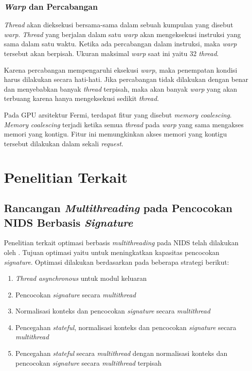 
    \subsubsection{\emph{Warp} dan Percabangan}

      \emph{Thread} akan dieksekusi bersama-sama dalam sebuah kumpulan yang disebut \emph{warp}. \emph{Thread} yang berjalan dalam satu \emph{warp} akan mengeksekusi instruksi yang sama dalam satu waktu. Ketika ada percabangan dalam instruksi, maka \emph{warp} tersebut akan berpisah. Ukuran maksimal \emph{warp} saat ini yaitu 32 \emph{thread}.

      Karena percabangan mempengaruhi eksekusi \emph{warp}, maka penempatan kondisi harus dilakukan secara hati-hati. Jika percabangan tidak dilakukan dengan benar dan menyebabkan banyak \emph{thread} terpisah, maka akan banyak \emph{warp} yang akan terbuang karena hanya mengeksekusi sedikit \emph{thread}.
      
      Pada GPU arsitektur Fermi, terdapat fitur yang disebut \emph{memory coalescing}. \emph{Memory coalescing} terjadi ketika semua \emph{thread} pada \emph{warp} yang sama mengakses memori yang kontigu. Fitur ini memungkinkan akses memori yang kontigu tersebut dilakukan dalam sekali \emph{request}.

\section{Penelitian Terkait}

  \subsection{Rancangan \emph{Multithreading} pada Pencocokan NIDS Berbasis \emph{Signature}} 

    Penelitian terkait optimasi berbasis \emph{multithreading} pada NIDS telah dilakukan oleh \cite{multi2004}. Tujuan optimasi yaitu untuk meningkatkan kapasitas pencocokan \emph{signature}. Optimasi dilakukan berdasarkan pada beberapa strategi berikut:

    \begin{enumerate}
      \item \emph{Thread asynchronous} untuk modul keluaran
      \item Pencocokan \emph{signature} secara \emph{multithread}
      \item Normalisasi konteks dan pencocokan \emph{signature} secara \emph{multithread}
      \item Pencegahan \emph{stateful}, normalisasi konteks dan pencocokan \emph{signature} secara \emph{multithread}
      \item Pencegahan \emph{stateful} secara \emph{multithread} dengan normalisasi konteks dan pencocokan \emph{signature} secara \emph{multithread} terpisah
    \end{enumerate}

